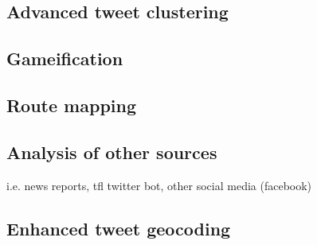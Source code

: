 
\subsection{Advanced tweet clustering}

\subsection{Gameification}

\subsection{Route mapping}

\subsection{Analysis of other sources}
i.e. news reports, tfl twitter bot, other social media (facebook)

\subsection{Enhanced tweet geocoding}
